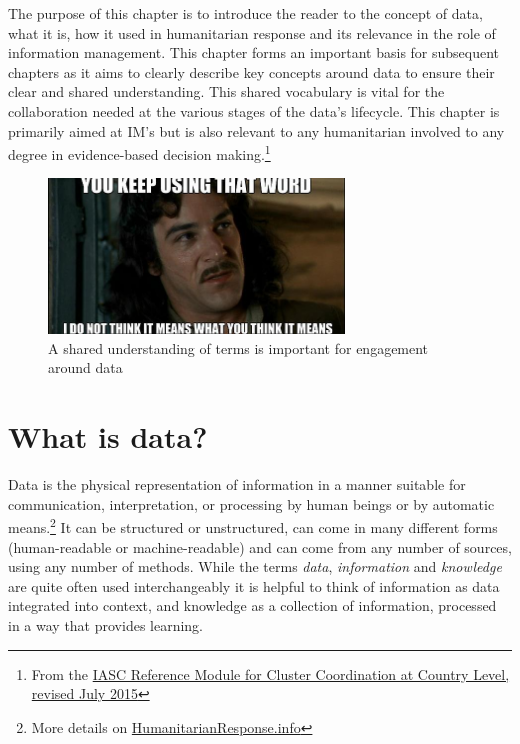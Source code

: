 \documentclass[
  a4paper,
  onecolumn,
  oneside]{book}
\begin{document}
The purpose of this chapter is to introduce the reader to the concept of
data, what it is, how it used in humanitarian response and its relevance
in the role of information management. This chapter forms an important
basis for subsequent chapters as it aims to clearly describe key
concepts around data to ensure their clear and shared understanding.
This shared vocabulary is vital for the collaboration needed at the
various stages of the data's lifecycle. This chapter is primarily aimed
at IM's but is also relevant to any humanitarian involved to any degree
in evidence-based decision making.\footnote{From the
  \href{files/Reference\%20Module\%20for\%20Cluster\%20Coordination\%20at\%20Country\%20Level.pdf}{IASC
  Reference Module for Cluster Coordination at Country Level, revised
  July 2015}}

\begin{figure}

{\centering \includegraphics[width=0.7\textwidth,height=\textheight]{part1/./images/idontthinkitmeanswhatyouthinkitmeans.jpg}

}

\caption{A shared understanding of terms is important for engagement
around data}

\end{figure}

\hypertarget{what-is-data}{%
\section{What is data?}\label{what-is-data}}

Data is the physical representation of information in a manner suitable
for communication, interpretation, or processing by human beings or by
automatic means.\footnote{More details on
  \href{https://www.humanitarianresponse.info/en/programme-cycle/space}{HumanitarianResponse.info}}
It can be structured or unstructured, can come in many different forms
(human-readable or machine-readable) and can come from any number of
sources, using any number of methods. While the terms \emph{data},
\emph{information} and \emph{knowledge} are quite often used
interchangeably it is helpful to think of information as data integrated
into context, and knowledge as a collection of information, processed in
a way that provides learning.
\end{document}
